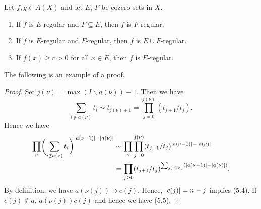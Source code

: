 


\begin{lemma}
Let $f, g\in  A(X)$ and let $E$, $F$ be cozero sets in $X$.
\begin{enumerate}
\item If $f$ is $E$-regular and $F\subseteq E$, then $f$ is $F$-regular.

\item If $f$ is $E$-regular and $F$-regular, then $f$ is $E\cup
F$-regular.

\item If $f(x)\ge c>0$ for all $x\in E$, then $f$ is $E$-regular.

\end{enumerate}
\end{lemma}

The following is an example of a proof.

\begin{proof} Set $j(\nu)=\max(I\backslash a(\nu))-1$. Then we have
\[
\sum_{i\notin a(\nu)}t_i\sim t_{j(\nu)+1}
  =\prod^{j(\nu)}_{j=0}(t_{j+1}/t_j).
\]
Hence we have
\begin{equation}
\begin{split}
\prod_\nu\biggl(\sum_{i\notin
  a(\nu)}t_i\biggr)^{\lvert a(\nu-1)\rvert-\lvert a(\nu)\rvert}
&\sim\prod_\nu\prod^{j(\nu)}_{j=0}
  (t_{j+1}/t_j)^{\lvert a(\nu-1)\rvert-\lvert a(\nu)\rvert}\\
&=\prod_{j\ge 0}(t_{j+1}/t_j)^{
  \sum_{j(\nu)\ge j}(\lvert a(\nu-1)\rvert-\lvert a(\nu)\rvert)}.
\end{split}
\end{equation}
By definition, we have $a(\nu(j))\supset c(j)$. Hence, $\lvert c(j)\rvert=n-j$
implies (5.4). If $c(j)\notin a$, $a(\nu(j))c(j)$ and hence
we have (5.5).
\end{proof}

